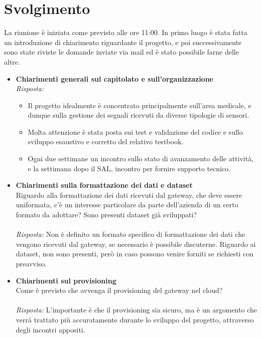 \documentclass[a4paper,12pt]{article}
\begin{document}
\section{Svolgimento}
    La riunione è iniziata come previsto alle ore 11:00. In primo luogo è stata fatta un introduzione di chiarimento riguardante il progetto, e poi successivamente sono state riviste le domande inviate via mail ed è stato possibile farne delle altre.
    \begin{itemize}
    \item \textbf{Chiarimenti generali sul capitolato e sull'organizzazione}\\
    \noindent
    \textit{Risposta:} \\
    \begin{itemize}
        \item Il progetto idealmente è concentrato principalmente sull'area medicale, e dunque sulla gestione dei segnali ricevuti da diverse tipologie di sensori.
        \item Molta attenzione è stata posta sui test e validazione del codice e sullo sviluppo esaustivo e corretto del relativo testbook.
        \item Ogni due settimane un incontro sullo stato di avanzamento delle attività, e la settimana dopo il SAL, incontro per fornire supporto tecnico.
    \end{itemize}
    
    \vspace{1cm}

    \item \textbf{Chiarimenti sulla formattazione dei dati e dataset}\\
    \noindent
    Riguardo alla formattazione dei dati ricevuti dal gateway, che deve essere uniformata, c'è un interesse particolare da parte dell'azienda di un certo formato da adottare? Sono presenti dataset già sviluppati?\\ \\
    \textit{Risposta:} 
    Non è definito un formato specifico di formattazione dei dati che vengono ricevuti dal gateway, se necessario è possibile discuterne. Riguardo ai dataset, non sono presenti, però in caso possono venire forniti se richiesti con preavviso.
    \vspace{1cm}
    

    \item \textbf{Chiarimenti sul provisioning}\\
    \noindent
    Come è previsto che avvenga il provisioning del gateway nel cloud?\\ \\
    \textit{Risposta:} 
    L'importante è che il provisioning sia sicuro, ma è un argomento che verrà trattato più accuratamente durante lo sviluppo del progetto, attraverso degli incontri appositi.
    \vspace{1cm}


\end{itemize}
\end{document}
